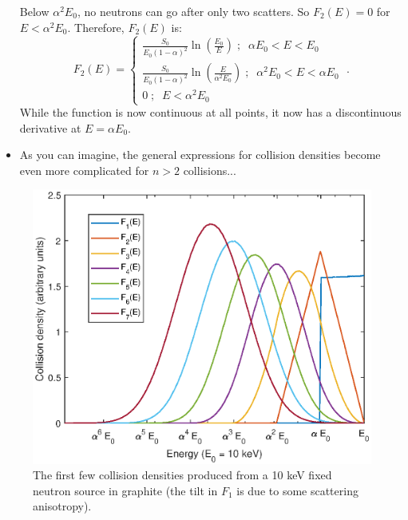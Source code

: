 \begin{itemize}
    Below $\alpha^2 E_0$, no neutrons can go after only two scatters. So $F_2(E) = 0$ for $E < \alpha^2 E_0$. Therefore, $F_2(E)$ is:
    \begin{equation*}
        F_2(E) = \left\{\begin{array}{lll}
        \frac{S_0}{E_0(1-\alpha)^2}\ln\left(\frac{E_0}{E}\right)\;\mathrm{;}\;\;\alpha E_0 < E < E_0 \\
        \frac{S_0}{E_0(1-\alpha)^2}\ln\left(\frac{E}{\alpha^2 E_0}\right)\;\mathrm{;}\;\;\alpha^2 E_0 < E < \alpha E_0\\
        0\;\mathrm{;}\;\; E < \alpha^2 E_0
        \end{array} 
      \right.\;\mathrm{.}
    \end{equation*}
    While the function is now continuous at all points, it now has a discontinuous derivative at $E = \alpha E_0$. 
    \item As you can imagine, the general expressions for collision densities become even more complicated for $n > 2$ collisions...
\end{itemize}

\begin{figure}[h]
  \centering
  \includegraphics[scale=0.70]{./Figures/P2/placzek_carbon.eps} 
  \caption{The first few collision densities produced from a 10 keV fixed neutron source in graphite (the tilt in $F_1$ is due to some scattering anisotropy).} 
  \label{fig:placzek}
\end{figure}

